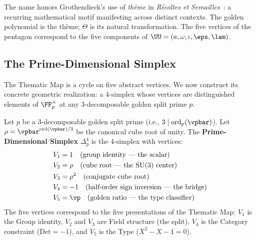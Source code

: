 \begin{remark}
The name honors Grothendieck's use of \emph{th\`eme} in \emph{R\'ecoltes et Semailles}~\cite{grothendieck-rs}: a recurring mathematical motif manifesting across distinct contexts. The golden polynomial is the th\`eme; $\Theta$ is its natural transformation. The five vertices of the pentagon correspond to the five components of $\UU = (a, \omega, \iota, \eps, \lam)$.
\end{remark}

\subsection{The Prime-Dimensional Simplex}

The Thematic Map is a cycle on five abstract vertices. We now construct its concrete geometric realization: a 4-simplex whose vertices are distinguished elements of $\FF_p^\times$ at any 3-decomposable golden split prime $p$.

\begin{definition}\label{def:simplex}
Let $p$ be a 3-decomposable golden split prime (i.e., $3 \mid \mathrm{ord}_p(\vpbar)$). Let $\rho = \vpbar^{\mathrm{ord}(\vpbar)/3}$ be the canonical cube root of unity. The \textbf{Prime-Dimensional Simplex} $\Delta^4_p$ is the 4-simplex with vertices:
\begin{align}
V_1 &= 1 \quad \text{(group identity --- the scalar)} \\
V_2 &= \rho \quad \text{(cube root --- the SU(3) center)} \\
V_3 &= \rho^2 \quad \text{(conjugate cube root)} \\
V_4 &= -1 \quad \text{(half-order sign inversion --- the bridge)} \\
V_5 &= \vp \quad \text{(golden ratio --- the type classifier)}
\end{align}
The five vertices correspond to the five presentations of the Thematic Map: $V_1$ is the Group identity, $V_2$ and $V_3$ are Field structure (the split), $V_4$ is the Category constraint ($\mathrm{Det} = -1$), and $V_5$ is the Type ($X^2 - X - 1 = 0$).
\end{definition}

